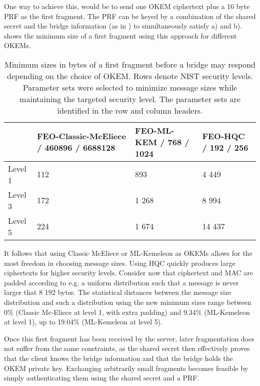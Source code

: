 One way to achieve this, would be to send one OKEM ciphertext plus a 16 byte PRF as the first fragment. The PRF can be keyed by a combination of the shared secret and the bridge information (as in \drivel{}) to simultaneously satisfy a) and b).
 shows the minimum size of a first fragment using this approach for different OKEMs.

\begin{table}
    \centering
    \begin{tabular}{@{} L{0.1\textwidth-\tabcolsep} | L{0.35\tabcolsep} L{0.25\tabcolsep} L{0.2\textwidth-\tabcolsep} @{}}
        & FEO-Classic-McEliece / 460896 / 6688128
        & FEO-ML-KEM / 768 / 1024
        & FEO-HQC / 192 / 256
        \\ \hline
    Level 1 & 112 & 893 & 4 449 \\
    Level 3 & 172 & 1 268 & 8 994 \\
    Level 5 & 224 & 1 674 & 14 437
    \end{tabular}
    \caption[
        Minimum sizes in bytes of a first fragment before a bridge may respond depending on the choice of OKEM.
    ]{
        Minimum sizes in bytes of a first fragment before a bridge may respond depending on the choice of OKEM. Rows denote NIST security levels. Parameter sets were selected to minimize message sizes while maintaining the targeted security level. The parameter sets are identified in the row and column headers.
    }
    \label{tab:frag-min-needed}
\end{table}

It follows that using Classic McEliece or ML-Kemeleon as OKEMs allows for the most freedom in choosing message sizes. Using HQC quickly produces large ciphertexts for higher security levels. Consider now that ciphertext and MAC are padded according to e.g. a uniform distribution such that a message is never larger that 8 192 bytes. The statistical distances between the \obfsfour{} message size distribution and such a distribution using the new minimum sizes range between 0\% (Classic Mc-Eliece at level 1, with extra padding) and 9.34\% (ML-Kemeleon at level 1), up to 19.04\% (ML-Kemeleon at level 5).

Once this first fragment has been received by the server, later fragmentation does not suffer from the same constraints, as the shared secret then effectively proves that the client knows the bridge information and that the bridge holds the OKEM private key. Exchanging arbitrarily small fragments becomes feasible by simply authenticating them using the shared secret and a PRF.


